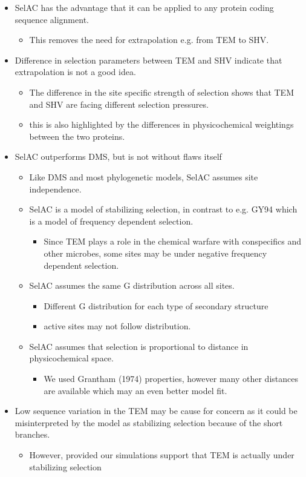 \documentclass[12pt]{article}
\begin{document}
\begin{itemize}
	\item SelAC has the advantage that it can be applied to any protein coding sequence alignment.
	\begin{itemize}
		\item This removes the need for extrapolation e.g. from TEM to SHV.
	\end{itemize}

	\item Difference in selection parameters between TEM and SHV indicate that extrapolation is not a good idea.
	\begin{itemize}
		\item The difference in the site specific strength of selection shows that TEM and SHV are facing different selection pressures.
		\item this is also highlighted by the differences in physicochemical weightings between the two proteins.
	\end{itemize}

	\item SelAC outperforms DMS, but is not without flaws itself
	\begin{itemize}
		\item Like DMS and most phylogenetic models, SelAC assumes site independence.
		\item SelAC is a model of stabilizing selection, in contrast to e.g. GY94 which is a model of frequency dependent selection.
		\begin{itemize}
			\item Since TEM plays a role in the chemical warfare with conspecifics and other microbes, some sites may be under negative frequency dependent selection.
		\end{itemize}
		\item SelAC assumes the same G distribution across all sites.
		\begin{itemize}
			\item Different G distribution for each type of secondary structure
			\item active sites may not follow distribution.
		\end{itemize}
		\item SelAC assumes that selection is proportional to distance in physicochemical space. 
		\begin{itemize}
			\item We used Grantham (1974) properties, however many other distances are available which may an even better model fit.
		\end{itemize}
	\end{itemize}
	\item Low sequence variation in the TEM may be cause for concern as it could be misinterpreted by the model as stabilizing selection because of the short branches.
	\begin{itemize}
		\item However, provided our simulations support that TEM is actually under stabilizing selection
	\end{itemize}


\end{itemize}
\end{document}
